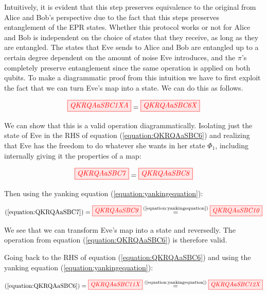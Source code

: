 \documentclass[]{article}
\newcommand{\equaltext}[1]{\ensuremath{\stackrel{\text{#1}}{=}}}
\begin{document}
Intuitively, it is evident that this step preserves equivalence to the original from Alice and Bob's perspective due to the fact that this steps preserves entanglement of the EPR states. Whether this protocol works or not for Alice and Bob is independent on the choice of states that they receive, as long as they are entangled. The states that Eve sends to Alice and Bob are entangled up to a certain degree dependent on the amount of noise Eve introduces, and the $\pi$'s completely preserve entanglement since the same operation is applied on both qubits. To make a diagrammatic proof from this intuition we have to first exploit the fact that we can turn Eve's map into a state. We can do this as follows.

\begin{equation}
\label{equation:QKRQAaSBC6}
\tikzfig{QKRQAaSBC1XA} = \tikzfig{QKRQAaSBC6X}
\end{equation}

We can show that this is a valid operation diagrammatically. Isolating just the state of Eve in the RHS of equation (\ref{equation:QKRQAaSBC6}) and realizing that Eve has the freedom to do whatever she wants in her state $\Phi_1$, including internally giving it the properties of a map:

\begin{equation}
\label{equation:QKRQAaSBC7}
\tikzfig{QKRQAaSBC7} = \tikzfig{QKRQAaSBC8}
\end{equation}

Then using the yanking equation (\ref{equation:yankingequation}):

\begin{equation}
\label{equation:QKRQAaSBC9}
(\ref{equation:QKRQAaSBC7}) = \tikzfig{QKRQAaSBC9} \equaltext{(\ref{equation:yankingequation})} \tikzfig{QKRQAaSBC10}
\end{equation}

We see that we can transform Eve's map into a state and reversedly. The operation from equation (\ref{equation:QKRQAaSBC6}) is therefore valid.

Going back to the RHS of equation (\ref{equation:QKRQAaSBC6}) and using the yanking equation (\ref{equation:yankingequation}):

\begin{equation}
\begin{aligned}
\label{equation:QKRQAaSBC11}
 (\ref{equation:QKRQAaSBC6}) = \tikzfig{QKRQAaSBC11X} \equaltext{(\ref{equation:yankingequation})} \tikzfig{QKRQAaSBC12X}
\end{aligned}
\end{equation}
\end{document}
